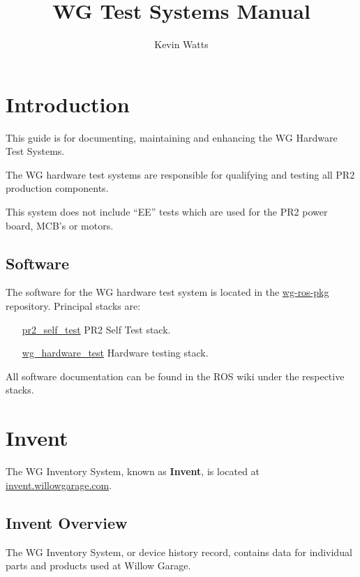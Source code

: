 \documentclass[11pt]{report}
\begin{document}
\title{WG Test Systems Manual}
\author{Kevin Watts}
\newcommand{\TODO}[1]{\textcolor{red}{TODO: #1}}
\maketitle

\tableofcontents
\newpage


\chapter {Introduction}

This guide is for documenting, maintaining and enhancing the WG Hardware Test Systems. 

The WG hardware test systems are responsible for qualifying and testing all PR2 production components.

This system does not include ``EE'' tests which are used for the PR2 power board, MCB's or motors.


\section {Software}

The software for the WG hardware test system is located in the \href{http://code.ros.org}{wg-ros-pkg} repository. Principal stacks are:
\begin{itemize}
\item [\href{http://www.ros.org/wiki/pr2\_self\_test}{pr2\_self\_test}] PR2 Self Test stack.
\item [\href{http://www.ros.org/wiki/wg\_hardware\_test}{wg\_hardware\_test}] Hardware testing stack.
\end{itemize}

All software documentation can be found in the ROS wiki under the respective stacks.

\chapter {Invent}

The WG Inventory System, known as {\bf Invent}, is located at \href{http://invent.willowgarage.com}{invent.willowgarage.com}. 

\section{Invent Overview}
The WG Inventory System, or device history record, contains data for individual parts and products used at Willow Garage. 
\end{document}
